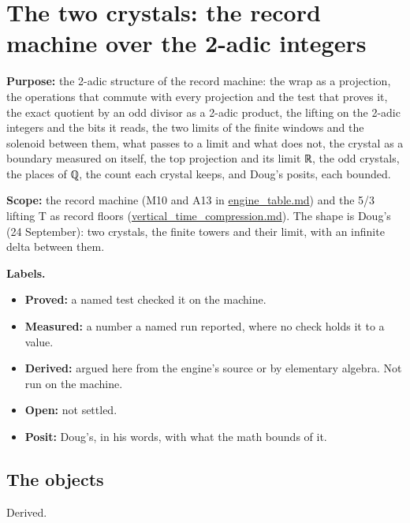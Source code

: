 \chapter{\texorpdfstring{The two crystals: the record machine over the 2-adic integers}{The two crystals: the record machine over the 2-adic integers}}
\label{chap:two-crystals}

\textbf{Purpose:} the 2-adic structure of the record machine: the wrap as a projection, the operations that commute with every projection and the test that proves it, the exact quotient by an odd divisor as a 2-adic product, the lifting on the 2-adic integers and the bits it reads, the two limits of the finite windows and the solenoid between them, what passes to a limit and what does not, the crystal as a boundary measured on itself, the top projection and its limit ℝ, the odd crystals, the places of ℚ, the count each crystal keeps, and Doug's posits, each bounded.

\textbf{Scope:} the record machine (M10 and A13 in \hyperref[chap:engine-table]{engine\_\allowbreak{}table.md}) and the 5/3 lifting T as record floors (\hyperref[chap:vertical-time-compression]{vertical\_\allowbreak{}time\_\allowbreak{}compression.md}). The shape is Doug's (24 September): two crystals, the finite towers and their limit, with an infinite delta between them.

\textbf{Labels.}

\begin{itemize}
\item \textbf{Proved:} a named test checked it on the machine.
\item \textbf{Measured:} a number a named run reported, where no check holds it to a value.
\item \textbf{Derived:} argued here from the engine's source or by elementary algebra. Not run on the machine.
\item \textbf{Open:} not settled.
\item \textbf{Posit:} Doug's, in his words, with what the math bounds of it.
\end{itemize}

\section{\texorpdfstring{The objects}{The objects}}

Derived.

